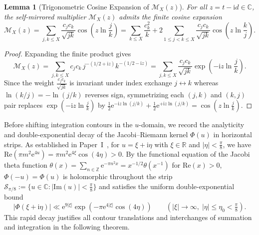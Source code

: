 \documentclass[11pt,reqno]{amsart}
\newtheorem{lemma}[theorem]{Lemma}
\theoremstyle{definition}
\theoremstyle{remark}
\numberwithin{equation}{section}
\newcommand{\R}{\mathbb{R}}
\newcommand{\C}{\mathbb{C}}
\newcommand{\Z}{\mathbb{Z}}
\newcommand{\ee}{\mathrm{e}}
\newcommand{\ii}{\mathrm{i}}
\newcommand{\Rea}{\mathrm{Re}}
\newcommand{\Ima}{\mathrm{Im}}
\begin{document}
\begin{lemma}[Trigonometric Cosine Expansion of $\mathcal{M}_X(z)$]\label{lem:cosine_expansion}
For all $z = t - \ii d \in \C$, the self-mirrored multiplier $\mathcal{M}_X(z)$ admits the finite cosine expansion
\begin{equation}\label{eq:Mcal_cosine}
\mathcal{M}_X(z) = \sum_{j,k \le X} \frac{c_j c_k}{\sqrt{jk}}\cos\!\left(z\ln\frac{j}{k}\right) = \sum_{k \le X} \frac{c_k^2}{k} + 2\sum_{1 \le j < k \le X} \frac{c_j c_k}{\sqrt{jk}}\cos\!\left(z\ln\frac{k}{j}\right).
\end{equation}
\end{lemma}

\begin{proof}
Expanding the finite product gives
\[
\mathcal{M}_X(z) = \sum_{j,k \le X} c_j c_k\, j^{-(1/2+\ii z)}k^{-(1/2-\ii z)} = \sum_{j,k \le X} \frac{c_j c_k}{\sqrt{jk}}\exp\!\left(-\ii z\ln\frac{j}{k}\right).
\]
Since the weight $\frac{c_j c_k}{\sqrt{jk}}$ is invariant under index exchange $j \leftrightarrow k$ whereas $\ln(k/j) = -\ln(j/k)$ reverses sign, symmetrizing each $(j,k)$ and $(k,j)$ pair replaces $\exp(-\ii z\ln\frac{j}{k})$ by $\frac{1}{2}\ee^{-\ii z\ln(j/k)} +\allowbreak \frac{1}{2}\ee^{+\ii z\ln(j/k)} =\allowbreak \cos(z\ln\frac{j}{k})$.
\end{proof}

Before shifting integration contours in the $u$-domain, we record the analyticity and double-exponential decay of the Jacobi--Riemann kernel $\Phi(u)$ in horizontal strips. As established in Paper~I~\cite{missiaen2026paper1}, for $u = \xi + \ii\eta$ with $\xi \in \R$ and $|\eta| < \frac{\pi}{8}$, we have $\Rea(\pi m^2 \ee^{4u}) = \pi m^2 \ee^{4\xi}\cos(4\eta) > 0$. By the functional equation of the Jacobi theta function $\theta(x) = \sum_{n \in \Z} \ee^{-\pi n^2 x} = x^{-1/2}\theta(x^{-1})$ for $\Rea(x) > 0$, $\Phi(-u) = \Phi(u)$ is holomorphic throughout the strip $\mathcal{S}_{\pi/8} := \{u \in \C : |\Ima(u)| < \frac{\pi}{8}\}$ and satisfies the uniform double-exponential bound
\begin{equation}\label{eq:phi_strip_decay}
|\Phi(\xi + \ii\eta)| \ll \ee^{9|\xi|}\exp\!\left(-\pi\ee^{4|\xi|}\cos(4\eta)\right) \qquad (|\xi| \to \infty,\; |\eta| \le \eta_0 < \tfrac{\pi}{8}).
\end{equation}
This rapid decay justifies all contour translations and interchanges of summation and integration in the following theorem.
\end{document}

